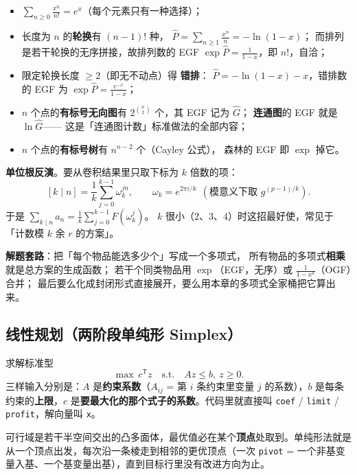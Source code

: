 		\begin{itemize}
			\item $\displaystyle \sum_{n\ge0}\frac{x^n}{n!} = e^x$（每个元素只有一种选择）；
			\item 长度为 $n$ 的\textbf{轮换}有 $(n-1)!$ 种，
			      $\displaystyle \hat P = \sum_{n\ge1}\frac{x^n}{n} = -\ln(1-x)$；
			      而排列是若干轮换的无序拼接，故排列数的 EGF
			      $\displaystyle \exp\hat P = \frac{1}{1-x}$，即 $n!$，自洽；
			\item 限定轮换长度 $\ge 2$（即无不动点）得 \textbf{错排}：
			      $\hat P = -\ln(1-x) - x$，错排数的 EGF 为
			      $\displaystyle \exp\hat P = \frac{e^{-x}}{1-x}$；
			\item $n$ 个点的\textbf{有标号无向图}有 $2^{\binom n2}$ 个，其 EGF 记为 $\hat G$；
			      \textbf{连通图}的 EGF 就是 $\ln \hat G$——
			      这是「连通图计数」标准做法的全部内容；
			\item $n$ 个点的\textbf{有标号树}有 $n^{n-2}$ 个（Cayley 公式），
			      森林的 EGF 即 $\exp$ 掉它。
		\end{itemize}

		\textbf{单位根反演}。要从卷积结果里只取下标为 $k$ 倍数的项：
		$$[k \mid n] = \frac{1}{k}\sum_{j=0}^{k-1}\omega_k^{jn},
		  \qquad \omega_k = e^{2\pi i/k}\ \ (\text{模意义下取 } g^{(p-1)/k}).$$
		于是 $\displaystyle \sum_{k \mid n} a_n = \frac1k \sum_{j=0}^{k-1} F(\omega_k^j)$。
		$k$ 很小（$2$、$3$、$4$）时这招最好使，常见于「计数模 $k$ 余 $r$ 的方案」。

		\textbf{解题套路}：把「每个物品能选多少个」写成一个多项式，
		所有物品的多项式\textbf{相乘}就是总方案的生成函数；
		若干个同类物品用 $\exp$（EGF，无序）或 $\frac{1}{1-x^k}$（OGF）合并；
		最后要么化成封闭形式直接展开，要么用本章的多项式全家桶把它算出来。

		\subsection{线性规划（两阶段单纯形 Simplex）}

		求解标准型
		$$
		\max\ c^{\mathsf T} z \quad \text{s.t.} \quad A z \le b,\ z \ge 0 .
		$$
		三样输入分别是：$A$ 是\textbf{约束系数}（$A_{ij}$ = 第 $i$ 条约束里变量 $j$ 的系数），$b$ 是每条约束的\textbf{上限}，$c$ 是\textbf{要最大化的那个式子的系数}。代码里就直接叫 \texttt{coef} / \texttt{limit} / \texttt{profit}，解向量叫 \texttt{x}。

		可行域是若干半空间交出的凸多面体，最优值必在某个\textbf{顶点}处取到。单纯形法就是从一个顶点出发，每次沿一条棱走到相邻的更优顶点（一次 \texttt{pivot} = 一个非基变量入基、一个基变量出基），直到目标行里没有改进方向为止。

